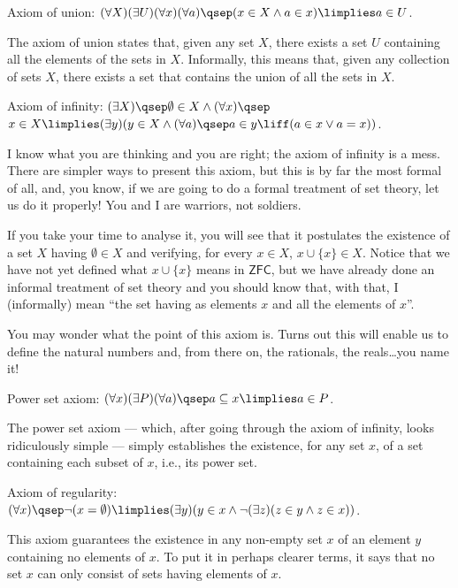 \begin{para}
\begin{axioms}
\item Axiom of union: $(\forall X)(\exists U)(\forall x)(\forall a)\qsep (x\in X \land a \in x) \limplies a\in U$.
\label{union}
\end{axioms}
The axiom of union states that, given any set $X$, there exists a set $U$ containing all the elements of the sets in $X$.
Informally, this means that, given any collection of sets $X$, there exists a set that contains the union of all the sets in $X$.

\begin{axioms}
\item \label{infinity} Axiom of infinity: $(\exists X)\qsep \emptyset \in X \land (\forall x)\qsep$\\
$x\in X \limplies (\exists y)(y \in X \land (\forall a)\qsep a\in y \liff (a \in x \lor a = x))$.
\end{axioms}
I know what you are thinking and you are right; the axiom of infinity is a mess.
There are simpler ways to present this axiom, but this is by far the most formal of all, and, you know, if we are going to do a formal treatment of set theory, let us do it properly! You and I are warriors, not soldiers.

If you take your time to analyse it, you will see that it postulates the existence of a set $X$ having $\emptyset \in X$ and verifying, for every $x\in X$, $x\cup \{x\} \in X$.
Notice that we have not yet defined what $x\cup \{x\}$ means in $\mathsf{ZFC}$, but we have already done an informal treatment of set theory and you should know that, with that, I (informally) mean ``the set having as elements $x$ and all the elements of $x$''.

You may wonder what the point of this axiom is. Turns out this will enable us to define the natural numbers and, from there on, the rationals, the reals\ldots you name it! 

\begin{axioms}
\item Power set axiom: $(\forall x)(\exists P)(\forall a)\qsep a\subseteq x \limplies a\in P$.
\label{powerset}
\end{axioms}

The power set axiom --- which, after going through the axiom of infinity, looks ridiculously simple --- simply establishes the existence, for any set $x$, of a set containing each subset of $x$, i.e., its power set.

\begin{axioms}
\item \label{regularity} Axiom of regularity: $(\forall x)\qsep \lnot(x=\emptyset) \limplies (\exists y)(y \in x \land \lnot (\exists z) (z\in y \land z \in x))$.
\end{axioms}
This axiom guarantees the existence in any non-empty set $x$ of an element $y$ containing no elements of $x$. To put it in perhaps clearer terms, it says that no set $x$ can only consist of sets having elements of $x$.


\end{para}
